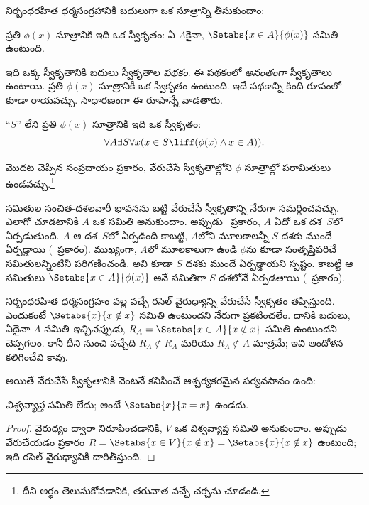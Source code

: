\documentclass[../../../include/open-logic-section]{subfiles}
\begin{document}

నిర్బంధరహిత ధర్మసంగ్రహానికి బదులుగా ఒక సూత్రాన్ని తీసుకుందాం:

\begin{axiom}[వేరుచేసే స్వీకృతాల పథకం] ప్రతి $\phi(x)$ సూత్రానికి
ఇది ఒక స్వీకృతం: ఏ $A$కైనా, $\Setabs{x \in A}{\phi(x)}$ సమితి ఉంటుంది.
\end{axiom}

ఇది ఒక్క స్వీకృతానికి బదులు స్వీకృతాల \emph{పథకం}.
ఈ పథకంలో \emph{అనంతంగా} స్వీకృతాలు ఉంటాయి.
ప్రతి $\phi(x)$ సూత్రానికీ ఒక స్వీకృతం ఉంటుంది.
ఇదే పథకాన్ని కింది రూపంలో కూడా రాయవచ్చు.
సాధారణంగా ఈ రూపాన్నే వాడతారు.

\begin{defish}
``$S$'' లేని ప్రతి
$\phi(x)$ సూత్రానికి
ఇది ఒక స్వీకృతం:
\[
	\forall A \exists S \forall x(x \in S \liff (\phi(x) \land x \in A)).
\]
\end{defish}

 మొదట
చెప్పిన సంప్రదాయం ప్రకారం,
వేరుచేసే స్వీకృతాల్లోని
$\phi$ సూత్రాల్లో పరామితులు
ఉండవచ్చు.\footnote{దీని అర్థం తెలుసుకోవడానికి,
తరువాత వచ్చే చర్చను చూడండి.}

సమితుల సంచిత-దశలవారీ భావనను బట్టి
వేరుచేసే స్వీకృతాన్ని నేరుగా సమర్థించవచ్చు.
ఎలాగో చూడటానికి $A$ ఒక సమితి అనుకుందాం. అప్పుడు
\stageshier\ ప్రకారం, $A$
ఏదో ఒక దశ~$S$లో
ఏర్పడుతుంది. $A$ ఆ
దశ~$S$లో ఏర్పడింది కాబట్టి,
$A$లోని మూలకాలన్నీ $S$
దశకు ముందే ఏర్పడ్డాయి
(\stagesacc\ ప్రకారం).
ముఖ్యంగా, $A$లో మూలకాలుగా
ఉండి $\phi$ను కూడా
సంతృప్తిపరిచే సమితులన్నింటినీ
పరిగణించండి. అవి కూడా
$S$ దశకు ముందే ఏర్పడ్డాయని
స్పష్టం. కాబట్టి ఆ సమితులు
$\Setabs{x \in A}{\phi(x)}$
అనే సమితిగా $S$ దశలోనే
ఏర్పడతాయి (\stagesacc\ ప్రకారం).

నిర్బంధరహిత ధర్మసంగ్రహం వల్ల వచ్చే రసెల్ వైరుధ్యాన్ని
వేరుచేసే స్వీకృతం తప్పిస్తుంది.
ఎందుకంటే $\Setabs{x}{x \notin
x}$ సమితి ఉంటుందని
నేరుగా ప్రకటించలేం.
దానికి బదులు, ఏదైనా
$A$ సమితి \emph{ఇచ్చినప్పుడు},
$R_A = \Setabs{x \in A}{x \notin x}$
సమితి ఉంటుందని చెప్పగలం.
కానీ దీని నుంచి వచ్చేది
$R_A \notin R_A$ మరియు
$R_A \notin A$ మాత్రమే;
ఇవి ఆందోళన కలిగించేవి కావు.

అయితే వేరుచేసే స్వీకృతానికి వెంటనే
కనిపించే ఆశ్చర్యకరమైన
పర్యవసానం ఉంది:

\begin{thm}
\emph{విశ్వవ్యాప్త} సమితి లేదు;
అంటే $\Setabs{x}{x = x}$ ఉండదు.
\end{thm}

\begin{proof}
వైరుధ్యం ద్వారా నిరూపించడానికి, $V$ ఒక విశ్వవ్యాప్త సమితి అనుకుందాం. అప్పుడు
వేరుచేయడం ప్రకారం
$R =
\Setabs{x \in V}{x \notin x} = \Setabs{x}{x \notin x}$
ఉంటుంది; ఇది రసెల్
వైరుధ్యానికి దారితీస్తుంది.
\end{proof}
\end{document}
